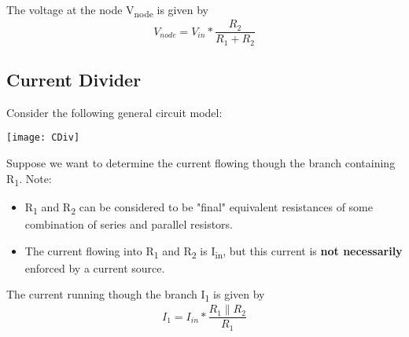 \documentclass[12pt,letterpaper]{article}
\begin{document}
The voltage at the node V\textsubscript{node} is given by 
\begin{equation} V_{node} = V_{in} * \frac{R_{2}}{R_{1}+R_{2}} \end{equation}

\subsection{Current Divider}
Consider the following general circuit model:

\begin{center}
\texttt{[image: CDiv]}
\end{center}

Suppose we want to determine the current flowing though the branch containing R\textsubscript{1}. Note:
\begin{itemize}
\item R\textsubscript{1} and R\textsubscript{2} can be considered to be "final" equivalent resistances of some combination of series and parallel resistors.
\item The current flowing into  R\textsubscript{1} and R\textsubscript{2} is I\textsubscript{in}, but this current is \textbf{not necessarily} enforced by a current source.
\end{itemize}


The current running though the branch I\textsubscript{1} is given by 
\begin{equation} I_{1} = I_{in} * \frac{R_{1} \parallel R_{2}}{R_{1}} \end{equation}
\end{document}
